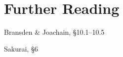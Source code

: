 \documentclass[pra,12pt]{revtex4}
\begin{document}
\section*{Further Reading}

\begin{enumerate}[[1{]}]
\item Bransden \& Joachain, \S10.1--10.5

\item Sakurai, \S6
\end{enumerate}
\end{document}
